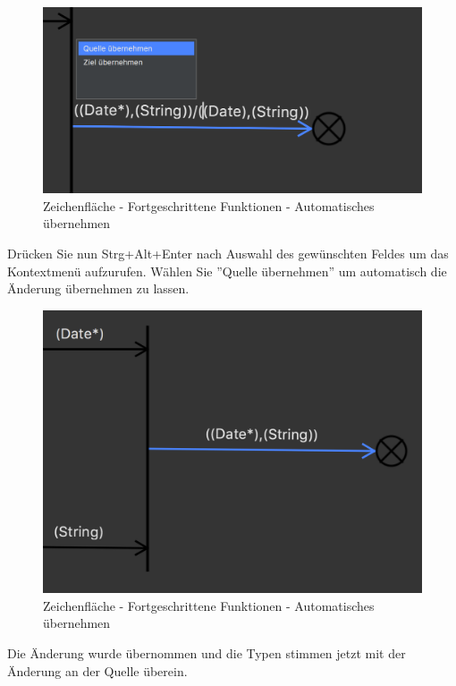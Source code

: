\begin{figure}[H]
	\centering
	\includegraphics[width=.6\textwidth]{Quelle3.png}
	\caption{Zeichenfläche - Fortgeschrittene Funktionen - Automatisches übernehmen}
\end{figure}
Drücken Sie nun Strg+Alt+Enter nach Auswahl des gewünschten Feldes um das Kontextmenü aufzurufen. Wählen Sie ''Quelle übernehmen'' um automatisch die Änderung übernehmen zu lassen.

\begin{figure}[H]
	\centering
	\includegraphics[width=.6\textwidth]{Quelle4.png}
	\caption{Zeichenfläche - Fortgeschrittene Funktionen - Automatisches übernehmen}
\end{figure}
Die Änderung wurde übernommen und die Typen stimmen jetzt mit der Änderung an der Quelle überein.

